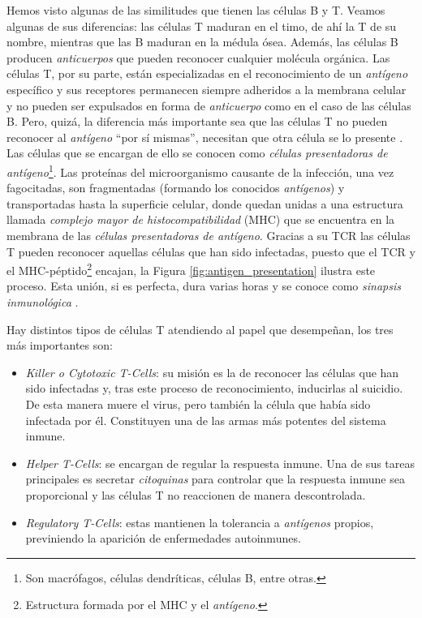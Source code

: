 Hemos visto algunas de las similitudes que tienen las células B y T. Veamos algunas de sus diferencias: las células T maduran en el timo, de ahí la T de su nombre, mientras que las B maduran en la médula ósea. Además, las células B producen \textit{anticuerpos} que pueden reconocer cualquier molécula orgánica. Las células T, por su parte, están especializadas en el reconocimiento de un \textit{antígeno} específico y sus receptores permanecen siempre adheridos a la membrana celular y no pueden ser expulsados en forma de \textit{anticuerpo} como en el caso de las células B. Pero, quizá, la diferencia más importante sea que las células T no pueden reconocer al \textit{antígeno} ``por sí mismas'', necesitan que otra célula se lo presente \citep{theHowItWorks}. Las células que se encargan de ello se conocen como \textit{células presentadoras de antígeno}\footnote{Son macrófagos, células dendríticas, células B, entre otras.}. Las proteínas del microorganismo causante de la infección, una vez fagocitadas, son fragmentadas (formando los conocidos \textit{antígenos}) y transportadas hasta la superficie celular, donde quedan unidas a una estructura llamada \textit{complejo mayor de histocompatibilidad} (MHC) que se encuentra en la membrana de las \textit{células presentadoras de antígeno}. Gracias a su TCR las células T pueden reconocer aquellas células que han sido infectadas, puesto que el TCR y el MHC-péptido\footnote{Estructura formada por el MHC y el \textit{antígeno}.} encajan, la Figura \ref{fig:antigen_presentation} ilustra este proceso. Esta unión, si es perfecta, dura varias horas y se conoce como \textit{sinapsis inmunológica} \citep{fernandez2012mecanica}.



Hay distintos tipos de células T atendiendo al papel que desempeñan, los tres más importantes son: 
\begin{itemize}
	\item \textit{Killer o Cytotoxic T-Cells}: su misión es la de reconocer las células que han sido infectadas y, tras este proceso de reconocimiento, inducirlas al suicidio. De esta manera muere el virus, pero también la célula que había sido infectada por él. Constituyen una de las armas más potentes del sistema inmune.
	
	\item \textit{Helper T-Cells}: se encargan de regular la respuesta inmune. Una de sus tareas principales es secretar \textit{citoquinas} para controlar que la respuesta inmune sea proporcional y las células T no reaccionen de manera descontrolada.
	
	\item \textit{Regulatory T-Cells}: estas mantienen la tolerancia a \textit{antígenos} propios, previniendo la aparición de enfermedades autoinmunes.
\end{itemize}



